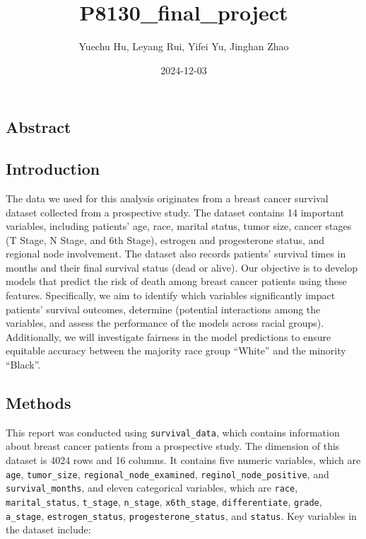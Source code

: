 \documentclass[
]{article}
\title{P8130\_final\_project}
\author{Yuechu Hu, Leyang Rui, Yifei Yu, Jinghan Zhao}
\date{2024-12-03}
\begin{document}
\maketitle

\subsection{Abstract}\label{abstract}

\subsection{Introduction}\label{introduction}

The data we used for this analysis originates from a breast cancer
survival dataset collected from a prospective study. The dataset
contains 14 important variables, including patients' age, race, marital
status, tumor size, cancer stages (T Stage, N Stage, and 6th Stage),
estrogen and progesterone status, and regional node involvement. The
dataset also records patients' survival times in months and their final
survival status (dead or alive). Our objective is to develop models that
predict the risk of death among breast cancer patients using these
features. Specifically, we aim to identify which variables significantly
impact patients' survival outcomes, determine (potential interactions
among the variables, and assess the performance of the models across
racial groups). Additionally, we will investigate fairness in the model
predictions to ensure equitable accuracy between the majority race group
``White'' and the minority ``Black''.

\subsection{Methods}\label{methods}

This report was conducted using \texttt{survival\_data}, which contains
information about breast cancer patients from a prospective study. The
dimension of this dataset is 4024 rows and 16 columns. It contains five
numeric variables, which are \texttt{age}, \texttt{tumor\_size},
\texttt{regional\_node\_examined}, \texttt{reginol\_node\_positive}, and
\texttt{survival\_months}, and eleven categorical variables, which are
\texttt{race}, \texttt{marital\_status}, \texttt{t\_stage},
\texttt{n\_stage}, \texttt{x6th\_stage}, \texttt{differentiate},
\texttt{grade}, \texttt{a\_stage}, \texttt{estrogen\_status},
\texttt{progesterone\_status}, and \texttt{status}. Key variables in the
dataset include:
\end{document}
